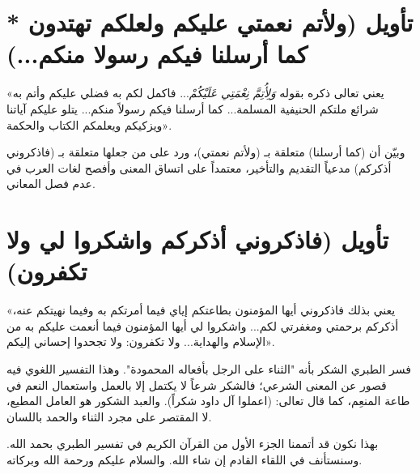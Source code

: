 \separator

\section{تأويل (ولأتم نعمتي عليكم ولعلكم تهتدون * كما أرسلنا فيكم رسولا منكم...)}
 «يعني تعالى ذكره بقوله \textit{وَلِأُتِمَّ نِعْمَتِي عَلَيْكُمْ}... فاكمل لكم به فضلي عليكم وأتم به شرائع ملتكم الحنيفية المسلمة... كما أرسلنا فيكم رسولاً منكم... يتلو عليكم آياتنا ويزكيكم ويعلمكم الكتاب والحكمة».

وبيّن أن (كما أرسلنا) متعلقة بـ (ولأتم نعمتي)، ورد على من جعلها متعلقة بـ (فاذكروني أذكركم) مدعياً التقديم والتأخير، معتمداً على اتساق المعنى وأفصح لغات العرب في عدم فصل المعاني.

\separator

\section{تأويل (فاذكروني أذكركم واشكروا لي ولا تكفرون)}
 «يعني بذلك فاذكروني أيها المؤمنون بطاعتكم إياي فيما أمرتكم به وفيما نهيتكم عنه، أذكركم برحمتي ومغفرتي لكم... واشكروا لي أيها المؤمنون فيما أنعمت عليكم به من الإسلام والهداية... ولا تكفرون: ولا تجحدوا إحساني إليكم».

\begin{fawaid}
فسر الطبري الشكر بأنه "الثناء على الرجل بأفعاله المحمودة". وهذا التفسير اللغوي فيه قصور عن المعنى الشرعي؛ فالشكر شرعاً لا يكتمل إلا بالعمل واستعمال النعم في طاعة المنعِم، كما قال تعالى: (اعملوا آل داود شكراً). والعبد الشكور هو العامل المطيع، لا المقتصر على مجرد الثناء والحمد باللسان.
\end{fawaid}

\separator

بهذا نكون قد أتممنا الجزء الأول من القرآن الكريم في تفسير الطبري بحمد الله. وسنستأنف في اللقاء القادم إن شاء الله. والسلام عليكم ورحمة الله وبركاته.

